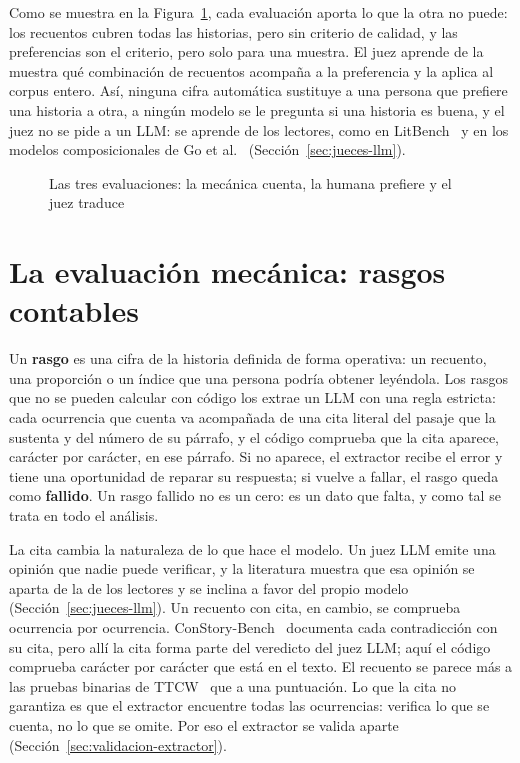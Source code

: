 Como se muestra en la Figura~\ref{fig:evaluacion}, cada evaluación aporta lo que la otra no puede:
los recuentos cubren todas las historias, pero sin criterio de calidad, y las preferencias son el
criterio, pero solo para una muestra. El juez aprende de la muestra qué combinación de recuentos
acompaña a la preferencia y la aplica al corpus entero. Así, ninguna cifra automática sustituye a
una persona que prefiere una historia a otra, a ningún modelo se le pregunta si una historia es
buena, y el juez no se pide a un LLM: se aprende de los lectores, como en LitBench~\cite{fein2026}
y en los modelos composicionales de Go et al.~\cite{go2024} (Sección~\ref{sec:jueces-llm}).

\begin{figure}[t]
  \centering
  
  \caption{Las tres evaluaciones: la mecánica cuenta, la humana prefiere y el juez traduce}
  \label{fig:evaluacion}
\end{figure}

\section{La evaluación mecánica: rasgos contables}\label{sec:rasgos}

Un \textbf{rasgo} es una cifra de la historia definida de forma operativa: un recuento, una
proporción o un índice que una persona podría obtener leyéndola. Los rasgos que no se pueden
calcular con código los extrae un LLM con una regla estricta: cada ocurrencia que cuenta va
acompañada de una cita literal del pasaje que la sustenta y del número de su párrafo, y el código
comprueba que la cita aparece, carácter por carácter, en ese párrafo. Si no aparece, el extractor
recibe el error y tiene una oportunidad de reparar su respuesta; si vuelve a fallar, el rasgo queda
como \textbf{fallido}. Un rasgo fallido no es un cero: es un dato que falta, y como tal se trata en
todo el análisis.

La cita cambia la naturaleza de lo que hace el modelo. Un juez LLM emite una opinión que nadie puede
verificar, y la literatura muestra que esa opinión se aparta de la de los lectores y se inclina a
favor del propio modelo (Sección~\ref{sec:jueces-llm}). Un recuento con cita, en cambio, se
comprueba ocurrencia por ocurrencia. ConStory-Bench~\cite{li2026} documenta cada contradicción con su
cita, pero allí la cita forma parte del veredicto del juez LLM; aquí el código comprueba carácter por
carácter que está en el texto. El recuento se parece más a las pruebas binarias de TTCW~\cite{chakrabarty2024} que a una puntuación. Lo que la
cita no garantiza es que el extractor encuentre todas las ocurrencias: verifica lo que se cuenta, no
lo que se omite. Por eso el extractor se valida aparte (Sección~\ref{sec:validacion-extractor}).

